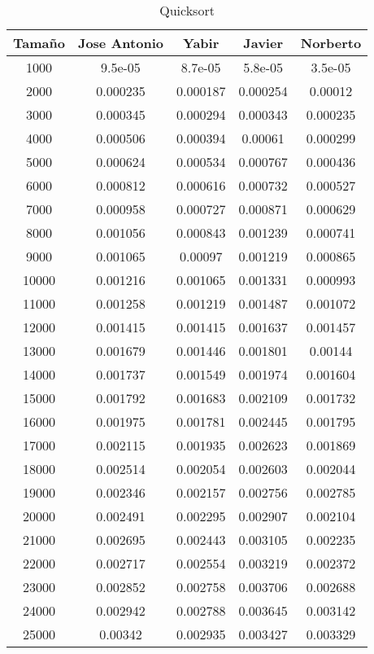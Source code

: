 \documentclass{article}
\begin{document}
\newpage

\begin{table}[h]
	\centering
	\caption{Quicksort}
\begin{tabular}{ | c | c  | c | c | c | }
  \hline
   Tama\~no & Jose Antonio & Yabir & Javier & Norberto\\ 
   \hline
1000	&	9.5e-05	&	8.7e-05	&	5.8e-05	&	3.5e-05	\\
2000	&	0.000235	&	0.000187	&	0.000254	&	0.00012	\\
3000	&	0.000345	&	0.000294	&	0.000343	&	0.000235	\\
4000	&	0.000506	&	0.000394	&	0.00061	&	0.000299	\\
5000	&	0.000624	&	0.000534	&	0.000767	&	0.000436	\\
6000	&	0.000812	&	0.000616	&	0.000732	&	0.000527	\\
7000	&	0.000958	&	0.000727	&	0.000871	&	0.000629	\\
8000	&	0.001056	&	0.000843	&	0.001239	&	0.000741	\\
9000	&	0.001065	&	0.00097	&	0.001219	&	0.000865	\\
10000	&	0.001216	&	0.001065	&	0.001331	&	0.000993	\\
11000	&	0.001258	&	0.001219	&	0.001487	&	0.001072	\\
12000	&	0.001415	&	0.001415	&	0.001637	&	0.001457	\\
13000	&	0.001679	&	0.001446	&	0.001801	&	0.00144	\\
14000	&	0.001737	&	0.001549	&	0.001974	&	0.001604	\\
15000	&	0.001792	&	0.001683	&	0.002109	&	0.001732	\\
16000	&	0.001975	&	0.001781	&	0.002445	&	0.001795	\\
17000	&	0.002115	&	0.001935	&	0.002623	&	0.001869	\\
18000	&	0.002514	&	0.002054	&	0.002603	&	0.002044	\\
19000	&	0.002346	&	0.002157	&	0.002756	&	0.002785	\\
20000	&	0.002491	&	0.002295	&	0.002907	&	0.002104	\\
21000	&	0.002695	&	0.002443	&	0.003105	&	0.002235	\\
22000	&	0.002717	&	0.002554	&	0.003219	&	0.002372	\\
23000	&	0.002852	&	0.002758	&	0.003706	&	0.002688	\\
24000	&	0.002942	&	0.002788	&	0.003645	&	0.003142	\\
25000	&	0.00342	&	0.002935	&	0.003427	&	0.003329	\\
\hline
\end{tabular}
\end{table}
\end{document}
